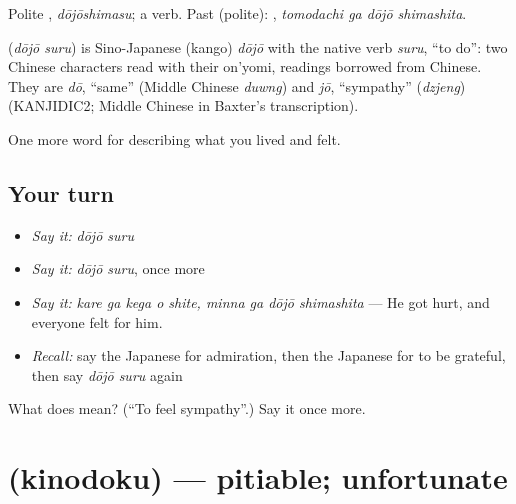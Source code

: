 Polite \textbf{}, \emph{dōjōshimasu}; a  verb. Past (polite): \textbf{ }, \emph{tomodachi ga dōjō shimashita}.

\begin{cousinweb}
\textbf{} (\emph{dōjō suru}) is Sino-Japanese (kango) \emph{dōjō} with the native verb \emph{suru}, \textquotedblleft{}to do\textquotedblright{}: two Chinese characters read with their on'yomi, readings borrowed from Chinese. They are \emph{dō}, \textquotedblleft{}same\textquotedblright{} (Middle Chinese \emph{duwng}) and \emph{jō}, \textquotedblleft{}sympathy\textquotedblright{} (\emph{dzjeng}) (KANJIDIC2; Middle Chinese in Baxter's transcription).
\end{cousinweb}

\begin{grammarlens}[title={What you've built}]
One more word for describing what you lived and felt.
\end{grammarlens}

\subsection*{Your turn}
\begin{itemize}
\raggedright
  \item \emph{Say it:} \emph{dōjō suru}
  \item \emph{Say it:} \emph{dōjō suru}, once more
  \item \emph{Say it:} \emph{kare ga kega o shite, minna ga dōjō shimashita} — He got hurt, and everyone felt for him.
  \item \emph{Recall:} say the Japanese for admiration, then the Japanese for to be grateful, then say \emph{dōjō suru} again
\end{itemize}

\begin{tcolorbox}[breakable,colback=teal!4,colframe=teal!35!black,title={Before you move on}]
What does  mean? (\textquotedblleft{}To feel sympathy\textquotedblright{}.) Say it once more.
\end{tcolorbox}
\section[\texorpdfstring{\ja{きのどく} (kinodoku)}{きのどく (kinodoku)}]{ (kinodoku) — pitiable; unfortunate}

\label{lesson:JA-C434-kinodoku}



